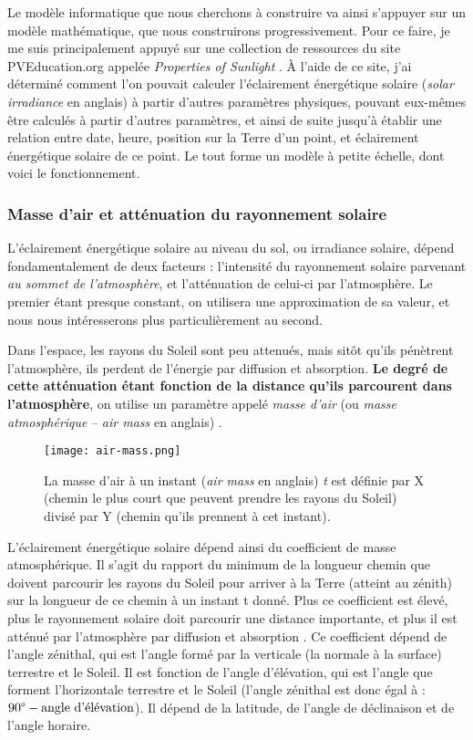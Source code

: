 \documentclass[12pt]{article}
\begin{document}
Le modèle informatique que nous cherchons à construire va ainsi s'appuyer sur un modèle mathématique, que nous construirons progressivement.
Pour ce faire, je me suis principalement appuyé sur une collection de ressources du site PVEducation.org appelée \emph{Properties of Sunlight} \cite{properties_of_sunlight}. À l'aide de ce site, j'ai déterminé comment l'on pouvait calculer l'éclairement énergétique solaire (\textit{solar irradiance} en anglais) à partir d'autres paramètres physiques, pouvant eux-mêmes être calculés à partir d'autres paramètres, et ainsi de suite jusqu'à établir une relation entre date, heure, position sur la Terre d'un point, et éclairement énergétique solaire de ce point. Le tout forme un modèle à petite échelle, dont voici le fonctionnement.

\subsubsection{Masse d'air et atténuation du rayonnement solaire}
L'éclairement énergétique solaire au niveau du sol, ou irradiance solaire, dépend fondamentalement de deux facteurs : l'intensité du rayonnement solaire parvenant \emph{au sommet de l'atmosphère}, et l'atténuation de celui-ci par l'atmosphère. Le premier étant presque constant, on utilisera une approximation de sa valeur, et nous nous intéresserons plus particulièrement au second.

Dans l'espace, les rayons du Soleil sont peu attenués, mais sitôt qu'ils pénètrent l'atmosphère, ils perdent de l'énergie par diffusion et absorption. \textbf{Le degré de cette atténuation étant fonction de la distance qu'ils parcourent dans l'atmosphère}, on utilise un paramètre appelé \emph{masse d'air} (ou \emph{masse atmosphérique} -- \textit{air mass} en anglais) \cite{air_mass_wiki}.

\begin{figure}[!ht]
	\centerline{\texttt{[image: air-mass.png]}}
	\caption{La masse d'air à un instant (\textit{air mass} en anglais) \textit{t} est définie par X (chemin le plus court que peuvent prendre les rayons du Soleil) divisé par Y (chemin qu'ils prennent à cet instant).}
	\label{fig:air-mass}
\end{figure}



L'éclairement énergétique solaire dépend ainsi du coefficient de masse atmosphérique. Il s'agit du rapport du minimum de la longueur chemin que doivent parcourir les rayons du Soleil pour arriver à la Terre (atteint au zénith) sur la longueur de ce chemin à un instant t donné. Plus ce coefficient est élevé, plus le rayonnement solaire doit parcourir une distance importante, et plus il est atténué par l'atmosphère par diffusion et absorption \cite{air_mass_wiki}.
Ce coefficient dépend de l'angle zénithal, qui est l'angle formé par la verticale (la normale à la surface) terrestre et le Soleil. Il est fonction de l'angle d'élévation, qui est l'angle que forment l'horizontale terrestre et le Soleil (l'angle zénithal est donc égal à : $90\degree - \textrm{angle d'élévation}$). Il dépend de la latitude, de l'angle de déclinaison et de l'angle horaire.
      
\end{document}
